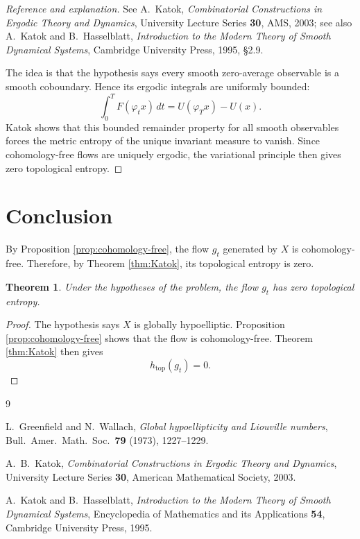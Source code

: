 \documentclass[11pt]{article}
\newtheorem{theorem}{Theorem}[section]
\theoremstyle{definition}
\begin{document}
\begin{proof}[Reference and explanation]
See A.~Katok, \emph{Combinatorial Constructions in Ergodic Theory and Dynamics}, University Lecture Series \textbf{30}, AMS, 2003; see also A.~Katok and B.~Hasselblatt, \emph{Introduction to the Modern Theory of Smooth Dynamical Systems}, Cambridge University Press, 1995, \S 2.9.

The idea is that the hypothesis says every smooth zero-average observable is a smooth coboundary. Hence its ergodic integrals are uniformly bounded:
\[
\int_0^T F(\varphi_t x)\,dt
=
U(\varphi_Tx)-U(x).
\]
Katok shows that this bounded remainder property for all smooth observables forces the metric entropy of the unique invariant measure to vanish. Since cohomology-free flows are uniquely ergodic, the variational principle then gives zero topological entropy.
\end{proof}

\section{Conclusion}

By Proposition \ref{prop:cohomology-free}, the flow \(g_t\) generated by \(X\) is cohomology-free. Therefore, by Theorem \ref{thm:Katok}, its topological entropy is zero.

\begin{theorem}
Under the hypotheses of the problem, the flow \(g_t\) has zero topological entropy.
\end{theorem}

\begin{proof}
The hypothesis says \(X\) is globally hypoelliptic. Proposition \ref{prop:cohomology-free} shows that the flow is cohomology-free. Theorem \ref{thm:Katok} then gives
\[
h_{\mathrm{top}}(g_t)=0.
\]
\end{proof}

\begin{thebibliography}{9}

L.~Greenfield and N.~Wallach,
\emph{Global hypoellipticity and Liouville numbers},
Bull.\ Amer.\ Math.\ Soc.\ \textbf{79} (1973), 1227--1229.

A.~B.~Katok,
\emph{Combinatorial Constructions in Ergodic Theory and Dynamics},
University Lecture Series \textbf{30}, American Mathematical Society, 2003.

A.~Katok and B.~Hasselblatt,
\emph{Introduction to the Modern Theory of Smooth Dynamical Systems},
Encyclopedia of Mathematics and its Applications \textbf{54}, Cambridge University Press, 1995.

\end{thebibliography}
\end{document}
